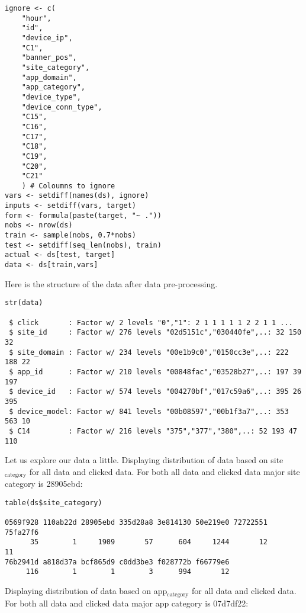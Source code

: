 \documentclass[11pt,a4paper]{article}
\begin{document}
\begin{verbatim}
ignore <- c(
    "hour", 
    "id",
    "device_ip",
    "C1",
    "banner_pos",
    "site_category",
    "app_domain",
    "app_category",
    "device_type",
    "device_conn_type",
    "C15",
    "C16",
    "C17",
    "C18",
    "C19",
    "C20",
    "C21"
    ) # Coloumns to ignore
vars <- setdiff(names(ds), ignore)
inputs <- setdiff(vars, target)
form <- formula(paste(target, "~ ."))
nobs <- nrow(ds)
train <- sample(nobs, 0.7*nobs)
test <- setdiff(seq_len(nobs), train)
actual <- ds[test, target]
data <- ds[train,vars]
\end{verbatim}

Here is the structure of the data after data pre-processing.

\begin{verbatim}
str(data)

 $ click       : Factor w/ 2 levels "0","1": 2 1 1 1 1 1 2 2 1 1 ...
 $ site_id     : Factor w/ 276 levels "02d5151c","030440fe",..: 32 150 32 
 $ site_domain : Factor w/ 234 levels "00e1b9c0","0150cc3e",..: 222 188 22
 $ app_id      : Factor w/ 210 levels "00848fac","03528b27",..: 197 39 197
 $ device_id   : Factor w/ 574 levels "004270bf","017c59a6",..: 395 26 395
 $ device_model: Factor w/ 841 levels "00b08597","00b1f3a7",..: 353 563 10
 $ C14         : Factor w/ 216 levels "375","377","380",..: 52 193 47 110
\end{verbatim}

Let us explore our data a little.
Displaying distribution of data based on site$_{\text{category}}$ for all data and clicked data. 
For both all data and clicked data major site category is 28905ebd:

\begin{verbatim}
table(ds$site_category)

0569f928 110ab22d 28905ebd 335d28a8 3e814130 50e219e0 72722551 75fa27f6 
      35        1     1909       57      604     1244       12       11 
76b2941d a818d37a bcf865d9 c0dd3be3 f028772b f66779e6 
     116        1        1        3      994       12
\end{verbatim}

Displaying distribution of data based on app$_{\text{category}}$ for all data and clicked data. For both all data and clicked data major app category is 07d7df22:
\end{document}
